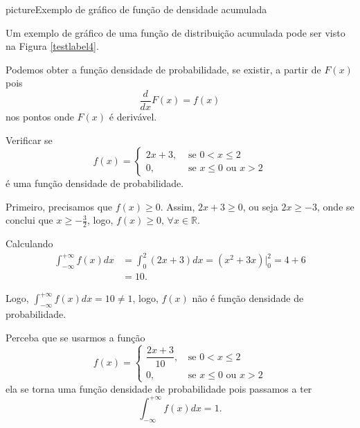 \documentclass[11pt,fleqn]{book}
\numberwithin{mpicture}{chapter}
\numberwithin{mtable}{chapter}
\numberwithin{mframe}{chapter}
\begin{document}
\begin{sidepicture}{0cm}{picture}{Exemplo de gráfico de função de densidade acumulada}
	\label{testlabel4}
\end{sidepicture}

Um exemplo de gráfico de uma função de distribuição acumulada pode ser visto na Figura \ref{testlabel4}.

\begin{remark}
	Podemos obter a função densidade de probabilidade, se existir, a partir de $F(x)$ pois
	\[
		\frac{d}{dx}F(x) = f(x)
	\]
	nos pontos onde $F(x)$ é derivável.
\end{remark}

\begin{example}
	Verificar se
	\[
		f(x)= \begin{cases}
			2x+3, &\text{ se } 0<x\leqslant 2\\
			0, &\text{ se } x \leqslant 0 \text{ ou } x > 2
		\end{cases}
	\]
	é uma função densidade de probabilidade.
	
	Primeiro, precisamos que  $f(x)\geqslant 0$. Assim, $2x+3\geqslant 0$, ou seja $2x\geqslant -3$, onde se conclui que $x \geqslant -\frac{3}{2}$, logo, $f(x)\geqslant 0$, $\forall x\in \mathbb{R}$.
	
	Calculando
	\begin{align*}
		\int_{-\infty}^{+\infty} f(x) dx &= \int_{0}^{2} (2x + 3)dx = (x^2+3x)\Big|_{0}^{2} = 4 + 6\\
										  &= 10\text{.}
	\end{align*}
	
	Logo, $\displaystyle \int_{-\infty}^{+\infty} f(x)dx = 10 \neq 1$, logo, $f(x)$ não é função densidade de probabilidade.
\end{example}

\begin{remark}
	Perceba que se usarmos a função
	\[
		f(x)=\begin{cases}
			\dfrac{2x+3}{10}\text{,} &\text{ se } 0<x\leqslant 2\\
			0\text{,} & \text{ se } x\leqslant 0\text{ ou }x>2
		\end{cases}
	\]
	ela se torna uma função densidade de probabilidade pois passamos a ter
	\[
		\int_{-\infty}^{+\infty} f(x)dx = 1
		\text{.}
	\]
\end{remark}
\end{document}
